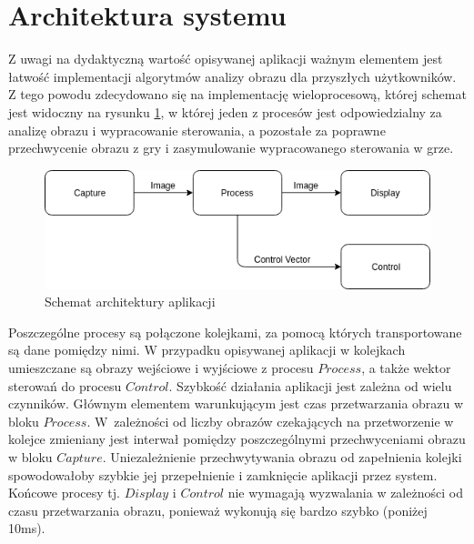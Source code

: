 
\section{Architektura systemu}

Z uwagi na dydaktyczną wartość opisywanej aplikacji ważnym elementem jest łatwość implementacji algorytmów analizy obrazu dla przyszłych użytkowników. %
Z tego powodu zdecydowano się na implementację wieloprocesową, której schemat jest widoczny na rysunku \ref{fig:arch}, w której jeden z procesów jest odpowiedzialny za analizę obrazu i wypracowanie sterowania, a pozostałe za poprawne przechwycenie obrazu z gry i zasymulowanie wypracowanego sterowania w grze. %

\begin{figure}
  \centering
  \includegraphics[width=13cm]{img/architektura.png}
  \caption{Schemat architektury aplikacji}
  \label{fig:arch}
\end{figure}

Poszczególne procesy są połączone kolejkami, za pomocą których transportowane są dane pomiędzy nimi. 
W przypadku opisywanej aplikacji w kolejkach umieszczane są obrazy wejściowe i wyjściowe z procesu $Process$, a także wektor sterowań do procesu $Control$. 
Szybkość działania aplikacji jest zależna od wielu czynników. 
Głównym elementem warunkującym jest czas przetwarzania obrazu w bloku $Process$. 
W~zależności od liczby obrazów czekających na przetworzenie w kolejce zmieniany jest interwał pomiędzy poszczególnymi przechwyceniami obrazu w bloku $Capture$. 
Uniezależnienie przechwytywania obrazu od zapełnienia kolejki spowodowałoby szybkie jej przepełnienie i zamknięcie aplikacji przez system.  %
Końcowe procesy tj. $Display$ i $Control$ nie wymagają wyzwalania w zależności od czasu przetwarzania obrazu, ponieważ wykonują się bardzo szybko (poniżej 10ms).

